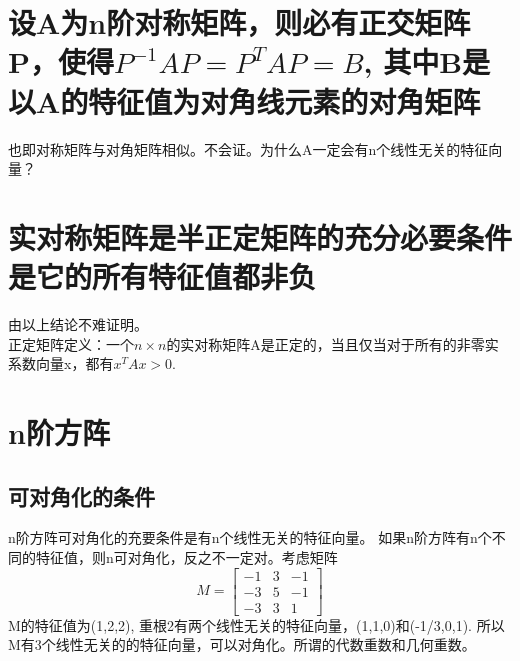 \documentclass[]{article}
\begin{document}
\section{设A为n阶对称矩阵，则必有正交矩阵P，使得$ P^{-1}AP = P^TAP = B $, 其中B是以A的特征值为对角线元素的对角矩阵}
也即对称矩阵与对角矩阵相似。不会证。为什么A一定会有n个线性无关的特征向量？

\section{实对称矩阵是半正定矩阵的充分必要条件是它的所有特征值都非负}
由以上结论不难证明。\\
正定矩阵定义：一个$ n \times n $的实对称矩阵A是正定的，当且仅当对于所有的非零实系数向量x，都有$ x^T A x > 0 $.

\section{n阶方阵}
\subsection{可对角化的条件}
n阶方阵可对角化的充要条件是有n个线性无关的特征向量。
如果n阶方阵有n个不同的特征值，则n可对角化，反之不一定对。考虑矩阵
\begin{equation}
M = 
\begin{bmatrix}
-1 & 3 & -1 \\
-3 & 5 & -1 \\
-3 & 3 & 1
\end{bmatrix}
\end{equation}
M的特征值为(1,2,2), 重根2有两个线性无关的特征向量，(1,1,0)和(-1/3,0,1). 所以M有3个线性无关的的特征向量，可以对角化。所谓的代数重数和几何重数。
\end{document}
